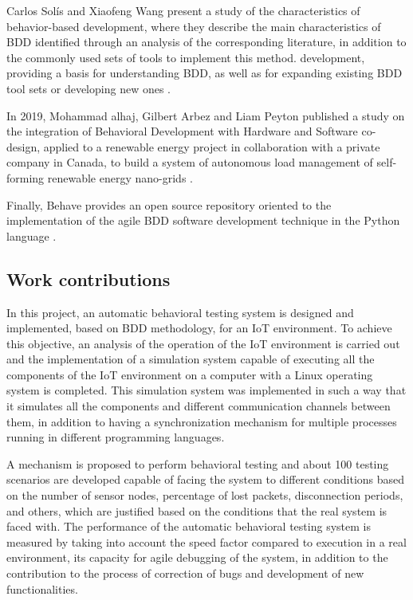 \documentclass[journal]{IEEEtran}	%
\begin{document}
Carlos Solís and Xiaofeng Wang present a study of the characteristics of behavior-based development, where they describe the main characteristics of BDD identified through an analysis of the corresponding literature, in addition to the commonly used sets of tools to implement this method. development, providing a basis for understanding BDD, as well as for expanding existing BDD tool sets or developing new ones \cite{solis2011study}.

In 2019, Mohammad alhaj, Gilbert Arbez and Liam Peyton published a study on the integration of Behavioral Development with Hardware and Software co-design, applied to a renewable energy project in collaboration with a private company in Canada, to build a system of autonomous load management of self-forming renewable energy nano-grids \cite{alhajapproach}.

Finally, Behave provides an open source repository oriented to the implementation of the agile BDD software development technique in the Python language \cite{behave2021github}.

\subsection{Work contributions}

In this project, an automatic behavioral testing system is designed and implemented, based on BDD methodology, for an IoT environment. To achieve this objective, an analysis of the operation of the IoT environment is carried out and the implementation of a simulation system capable of executing all the components of the IoT environment on a computer with a Linux operating system is completed. This simulation system was implemented in such a way that it simulates all the components and different communication channels between them, in addition to having a synchronization mechanism for multiple processes running in different programming languages.

A mechanism is proposed to perform behavioral testing and about 100 testing scenarios are developed capable of facing the system to different conditions based on the number of sensor nodes, percentage of lost packets, disconnection periods, and others, which are justified based on the conditions that the real system is faced with. The performance of the automatic behavioral testing system is measured by taking into account the speed factor compared to execution in a real environment, its capacity for agile debugging of the system, in addition to the contribution to the process of correction of bugs and development of new functionalities.
\end{document}
